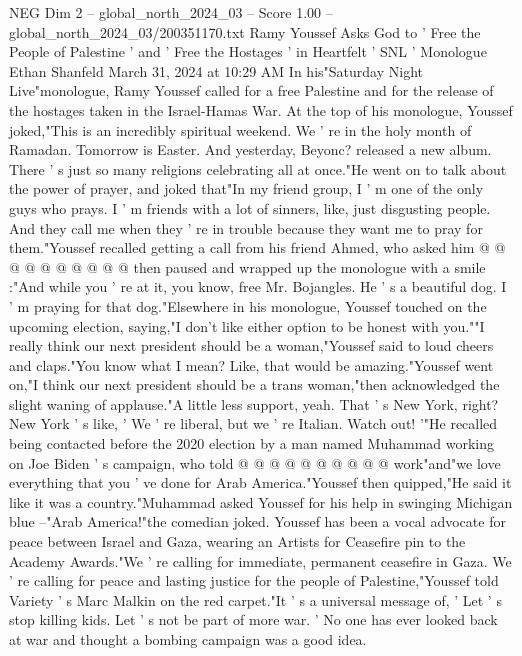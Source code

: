 \begin{textsample}{NEG Dim 2 – global\_north\_2024\_03 – Score 1.00 – global\_north\_2024\_03/200351170.txt}  \label{ex:f2_neg_339}
Ramy Youssef Asks God to ' Free the People of Palestine ' and ' Free the Hostages ' in Heartfelt ' SNL ' Monologue Ethan Shanfeld March 31, 2024 at 10:29 AM In his"Saturday Night Live"monologue, Ramy Youssef called for a free Palestine and for the release of the hostages taken in the Israel-Hamas War.
At the top of his monologue, Youssef joked,"This is an incredibly spiritual weekend.
We ' re in the holy month of Ramadan.
Tomorrow is Easter.
And yesterday, Beyonc? released a new album.
There ' s just so many religions celebrating all at once."He went on to talk about the power of prayer, and joked that"In my friend group, I ' m one of the only guys who prays.
I ' m friends with a lot of sinners, like, just disgusting people.
And they call me when they ' re in trouble because they want me to pray for them."Youssef recalled getting a call from his friend Ahmed, who asked him @ @ @ @ @ @ @ @ @ @ then paused and wrapped up the monologue with a smile :"And while you ' re at it, you know, free Mr.
Bojangles.
He ' s a beautiful dog.
I ' m praying for that dog."Elsewhere in his monologue, Youssef touched on the upcoming election, saying,"I don't like either option to be honest with you.""I really think our next president should be a woman,"Youssef said to loud cheers and claps."You know what I mean?
Like, that would be amazing."Youssef went on,"I think our next president should be a trans woman,"then acknowledged the slight waning of applause."A little less support, yeah.
That ' s New York, right?
New York ' s like, ' We ' re liberal, but we ' re Italian.
Watch out! '"He recalled being contacted before the 2020 election by a man named Muhammad working on Joe Biden ' s campaign, who told @ @ @ @ @ @ @ @ @ @ work"and"we love everything that you ' ve done for Arab America."Youssef then quipped,"He said it like it was a country."Muhammad asked Youssef for his help in swinging Michigan blue --"Arab America!"the comedian joked.
Youssef has been a vocal advocate for peace between Israel and Gaza, wearing an Artists for Ceasefire pin to the Academy Awards."We ' re calling for immediate, permanent ceasefire in Gaza.
We ' re calling for peace and lasting justice for the people of Palestine,"Youssef told Variety ' s Marc Malkin on the red carpet."It ' s a universal message of, ' Let ' s stop killing kids.
Let ' s not be part of more war. ' No one has ever looked back at war and thought a bombing campaign was a good idea.

\end{textsample}
